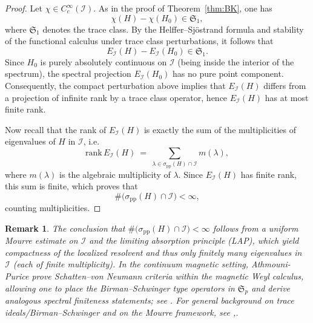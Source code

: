\documentclass[10pt]{amsart} %
\newcommand{\1}{{\mathbb{I}}}
\numberwithin{equation}{section}
\newtheorem{remark}[theorem]{Remark}%
\begin{document}
\begin{proof}
Let $\chi\in C_c^\infty(\mathcal{I})$. As in the proof of Theorem~\ref{thm:BK}, one has
\[
\chi(H)-\chi(H_0)\in\mathfrak{S}_1,
\]
where $\mathfrak{S}_1$ denotes the trace class.
By the Helffer--Sjöstrand formula and stability of the functional calculus under trace class perturbations, it follows that
\[
E_{\mathcal{I}}(H)-E_{\mathcal{I}}(H_0)\in\mathfrak{S}_1.
\]
Since $H_0$ is purely absolutely continuous on $\mathcal{I}$ (being inside the interior of the spectrum), the spectral projection $E_{\mathcal{I}}(H_0)$ has no pure point component. Consequently, the compact perturbation above implies that $E_{\mathcal{I}}(H)$ differs from a projection of infinite rank by a trace class operator, hence $E_{\mathcal{I}}(H)$ has at most finite rank.

Now recall that the rank of $E_{\mathcal{I}}(H)$ is exactly the sum of the multiplicities of eigenvalues of $H$ in $\mathcal{I}$, i.e.
\[
\mathrm{rank}\,E_{\mathcal{I}}(H)\ =\ \sum_{\lambda\in\sigma_{\mathrm{pp}}(H)\cap \mathcal{I}} m(\lambda),
\]
where $m(\lambda)$ is the algebraic multiplicity of $\lambda$.
Since $E_{\mathcal{I}}(H)$ has finite rank, this sum is finite, which proves that
\[
\#\big(\sigma_{\mathrm{pp}}(H)\cap \mathcal{I}\big)<\infty,
\]
counting multiplicities.
\end{proof}


\begin{remark}
The conclusion that $\#\bigl(\sigma_{\mathrm{pp}}(H)\cap\mathcal I\bigr)<\infty$ follows from a uniform Mourre estimate on $\mathcal I$ and the limiting absorption principle (LAP), which yield compactness of the localized resolvent and thus only finitely many eigenvalues in $\mathcal I$ (each of finite multiplicity).
In the continuum magnetic setting, Athmouni-Purice prove Schatten--von Neumann criteria within the magnetic Weyl calculus, allowing one to place the Birman--Schwinger type operators in $\mathfrak S_p$ and derive analogous spectral finiteness statements; see \cite{AthmouniPurice-CPDE-2018}. For general background on trace ideals/Birman--Schwinger and on the Mourre framework, see \cite{Simon-TraceIdeals},\cite[vol.IV]{RS}.
\end{remark}
\end{document}
